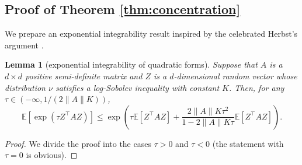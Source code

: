 \documentclass[11pt,a4paper]{article}
\newtheorem{lemma}[theorem]{Lemma}
\theoremstyle{remark}
\theoremstyle{definition}
\newcommand{\bZ}{Z}
\newcommand{\bfA}{A}
\newcommand{\E}{\mathbb{E}}
\theoremstyle{definition}
\begin{document}
\begin{bibunit}[apalike]
\subsection{Proof of Theorem \ref{thm:concentration}}
We prepare an exponential integrability result inspired by the celebrated Herbst's argument \citep{ledoux1999concentration,bakry2014analysis}.
\begin{lemma}[exponential integrability of quadratic forms]\label{lemma:expmoment}
    Suppose that $\bfA$ is a $d\times d$ positive semi-definite matrix and $\bZ$ is a $d$-dimensional random vector whose distribution $\nu$ satisfies a log-Sobolev inequality with constant $K$.
    Then, for any $\tau\in(-\infty,1/(2\|\bfA\|K))$,
    \begin{equation*}
        \E[\exp(\tau\bZ^{\top}\bfA\bZ)]\le \exp\left(\tau\E[\bZ^{\top}\bfA\bZ]+\frac{2\|\bfA\|K\tau^{2}}{1-2\|\bfA\|K\tau}\E[\bZ^{\top}\bfA\bZ]\right).
    \end{equation*}
\end{lemma}

\begin{proof}
We divide the proof into the cases $\tau > 0$ and $\tau < 0$ (the statement with $\tau=0$ is obvious).


\end{proof}
\end{bibunit}
\end{document}
